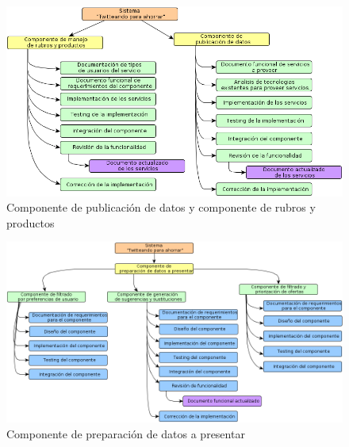 \documentclass[10pt, a4paper]{article}
\newcommand{\escaladefault}{0.85}
\begin{document}
\begin{figure}[H]
\centering
\includegraphics[scale=\escaladefault]{graficos/wbs/comp_rubros_y_api.png}
\caption{Componente de publicación de datos y componente de rubros y productos}
\end{figure}

\begin{figure}[H]
\centering
\includegraphics[scale=\escaladefault]{graficos/wbs/com_prep_de_datos.png}
\caption{Componente de preparación de datos a presentar}
\end{figure}
\end{document}
